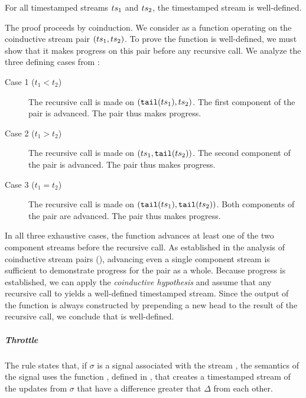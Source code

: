 \begin{lemma}
    For all timestamped streams $ts_1$ and $ts_2$, the timestamped stream 
    is well-defined.
\end{lemma}
\begin{skippableproof}
    The proof proceeds by coinduction. We consider  as a function operating on the
    coinductive stream pair $(ts_1, ts_2)$. To prove the function is well-defined, we must show
    that it makes progress on this pair before any recursive call. We analyze the three defining
    cases from :
    \begin{description}
        \item[Case 1 ($t_1 < t_2$)] The recursive call is made on $(\texttt{tail}(ts_1), ts_2)$.
              The first component of the pair is advanced. The pair thus makes progress.

        \item[Case 2 ($t_1 > t_2$)] The recursive call is made on $(ts_1, \texttt{tail}(ts_2))$.
              The second component of the pair is advanced. The pair thus makes progress.

        \item[Case 3 ($t_1 = t_2$)] The recursive call is made on $(\texttt{tail}(ts_1), \texttt{tail}(ts_2))$.
              Both components of the pair are advanced. The pair thus makes progress.
    \end{description}
    In all three exhaustive cases, the function advances at least one of the two component streams
    before the recursive call. As established in the analysis of coinductive stream pairs
    (), advancing even a single component stream
    is sufficient to demonstrate progress for the pair as a whole.
    Because progress is established, we can apply the \emph{coinductive hypothesis} and assume that
    any recursive call to  yields a well-defined timestamped stream. Since the
    output of the function is always constructed by prepending a new head to the result of the
    recursive call, we conclude that  is well-defined.
\end{skippableproof}

\subparagraph{Throttle}

The rule  states that, if $\sigma$ is a signal
associated with the stream \ts, the semantics of the signal \throttle{\sigma}{\Delta} uses the
function , defined in , that creates a timestamped stream of the
updates from $\sigma$ that have a difference greater that $\Delta$ from each other.

